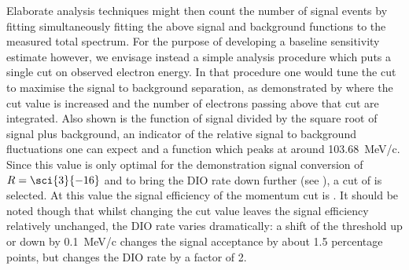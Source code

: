 \FigSensMomIntegral
Elaborate analysis techniques might then count the number of signal events by fitting simultaneously fitting the above signal and background functions to the measured total spectrum.
For the purpose of developing a baseline sensitivity estimate however, we envisage instead a simple analysis procedure which puts a single cut on observed electron energy.
In that procedure one would tune the cut to maximise the signal to background separation, as demonstrated by  where the cut value is increased and the number of electrons passing above that cut are integrated.
Also shown is the function of signal divided by the square root of signal plus background, an indicator of the relative signal to background fluctuations one can expect and a function which peaks at around 103.68~MeV/c.
Since this value is only optimal for the demonstration signal conversion of $R=\sci{3}{-16}$ and to bring the \ac{DIO} rate down further (see ), a cut of \VarMomThreshold is selected.
At this value the signal efficiency of the momentum cut is \VarAcceptanceMom.
It should be noted though that whilst changing the cut value leaves the signal efficiency relatively unchanged, the DIO rate varies dramatically: a shift of the threshold up or down by 0.1~MeV/c changes the signal acceptance by about 1.5 percentage points, but changes the DIO rate by a factor of 2.


